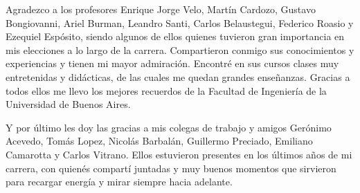 Agradezco a los profesores Enrique Jorge Velo, Martín Cardozo, Gustavo Bongiovanni, Ariel Burman, Leandro Santi, Carlos Belaustegui, Federico Roasio y Ezequiel Espósito, siendo algunos de ellos quienes tuvieron gran importancia en mis elecciones a lo largo de la carrera. Compartieron conmigo sus conocimientos y experiencias y tienen mi mayor admiración. Encontré en sus cursos clases muy entretenidas y didácticas, de las cuales me quedan grandes enseñanzas. Gracias a todos ellos me llevo los mejores recuerdos de la Facultad de Ingeniería de la Universidad de Buenos Aires. 

Y por último les doy las gracias a mis colegas de trabajo y amigos Gerónimo Acevedo, Tomás Lopez, Nicolás Barbalán, Guillermo Preciado, Emiliano Camarotta y Carlos Vitrano. Ellos estuvieron presentes en los últimos años de mi carrera, con quienés compartí juntadas y muy buenos momentos que sirvieron para recargar energía y mirar siempre hacia adelante.